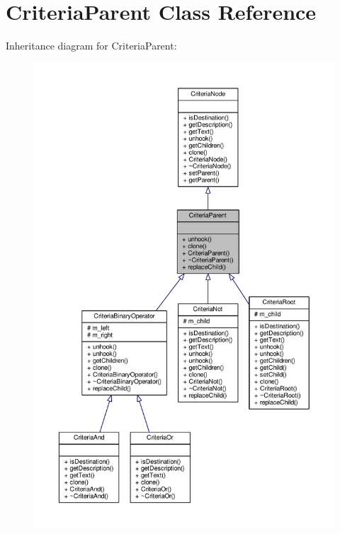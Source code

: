 \hypertarget{classCriteriaParent}{}\section{Criteria\+Parent Class Reference}
\label{classCriteriaParent}


Inheritance diagram for Criteria\+Parent\+:
\nopagebreak
\begin{figure}[H]
\begin{center}
\leavevmode
\includegraphics[width=350pt]{da/daa/classCriteriaParent__inherit__graph}
\end{center}
\end{figure}



